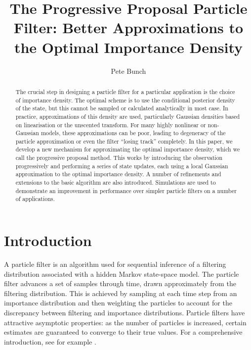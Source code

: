 \documentclass{article}
\title{The Progressive Proposal Particle Filter: Better Approximations to the Optimal Importance Density}
\author{Pete Bunch}
\begin{document}
\maketitle

\begin{abstract}
The crucial step in designing a particle filter for a particular application is the choice of importance density. The optimal scheme is to use the conditional posterior density of the state, but this cannot be sampled or calculated analytically in most case. In practice, approximations of this density are used, particularly Gaussian densities based on linearisation or the unscented transform. For many highly nonlinear or non-Gaussian models, these approximations can be poor, leading to degeneracy of the particle approximation or even the filter ``losing track'' completely. In this paper, we develop a new mechanism for approximating the optimal importance density, which we call the progressive proposal method. This works by introducing the observation progressively and performing a series of state updates, each using a local Gaussian approximation to the optimal importance density. A number of refinements and extensions to the basic algorithm are also introduced. Simulations are used to demonstrate an improvement in performance over simpler particle filters on a number of applications.
\end{abstract}






\section{Introduction}

A particle filter is an algorithm used for sequential inference of a filtering distribution associated with a hidden Markov state-space model. The particle filter advances a set of samples through time, drawn approximately from the filtering distribution. This is achieved by sampling at each time step from an importance distribution and then weighting the particles to account for the discrepancy between filtering and importance distributions. Particle filters have attractive asymptotic properties: as the number of particles is increased, certain estimates are guaranteed to converge to their true values. For a comprehensive introduction, see for example \citep{Cappe2007,Doucet2009}.
\end{document}
